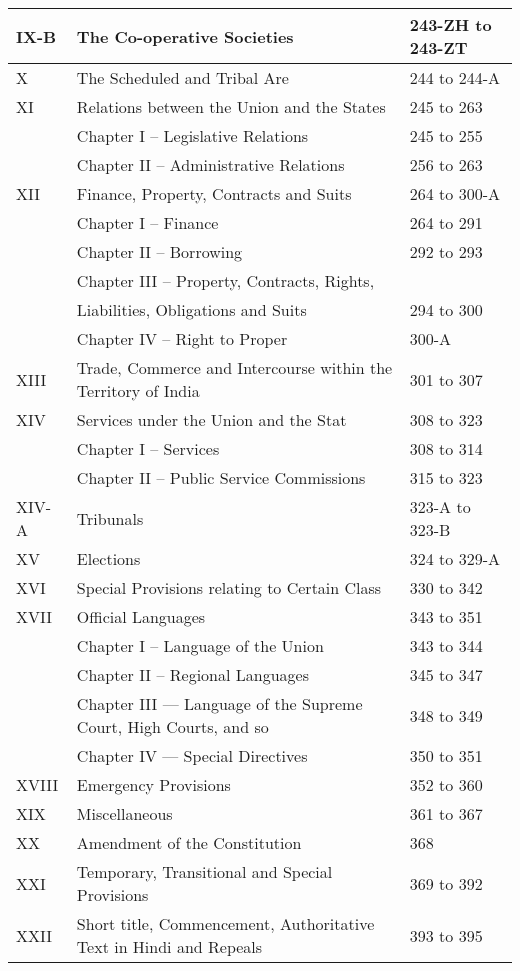 \begin{multicol}{2}
{\begin{longtable}[c]{@{}|p{1cm}|p{7cm}|p{4cm}|@{}}
  IX-B & The Co-operative Societies & 243-ZH to 243-ZT \\\midrule
  X & The Scheduled and Tribal Are & 244 to 244-A \\\midrule
  XI & Relations between the Union and the States & 245 to 263 \\
  & Chapter I – Legislative Relations & 245 to 255 \\
  & Chapter II – Administrative Relations & 256 to 263 \\\midrule
  XII & Finance, Property, Contracts and Suits & 264 to 300-A \\*\midrule
  & Chapter I – Finance & 264 to 291 \\
  & Chapter II – Borrowing & 292 to 293 \\
  & Chapter III – Property, Contracts, Rights, &  \\
  & Liabilities, Obligations and Suits & 294 to 300 \\
  & Chapter IV – Right to Proper & 300-A \\ \midrule
  XIII & Trade, Commerce and Intercourse within the Territory of India & 301 to 307 \\\midrule
  XIV & Services under the Union and the Stat & 308 to 323 \\
  & Chapter I – Services & 308 to 314 \\
  & Chapter II – Public Service Commissions & 315 to 323 \\\midrule
  XIV-A & Tribunals & 323-A to 323-B \\\midrule
  XV & Elections & 324 to 329-A \\\midrule
  XVI & Special Provisions relating to Certain Class & 330 to 342 \\\midrule
  XVII & Official Languages & 343 to 351 \\
  & Chapter I – Language of the Union & 343 to 344 \\
  & Chapter II – Regional Languages & 345 to 347 \\
  & Chapter III — Language of the Supreme Court, High Courts, and so & 348 to 349 \\
  & Chapter IV — Special Directives & 350 to 351 \\\midrule
  XVIII & Emergency Provisions & 352 to 360 \\\midrule
  XIX & Miscellaneous & 361 to 367 \\\midrule
  XX & Amendment of the Constitution & 368 \\\midrule
  XXI & Temporary, Transitional and Special Provisions & 369 to 392 \\\midrule
  XXII & Short title, Commencement, Authoritative Text in Hindi and Repeals & 393 to 395\\\bottomrule
\end{longtable}

}
\end{multicol}
